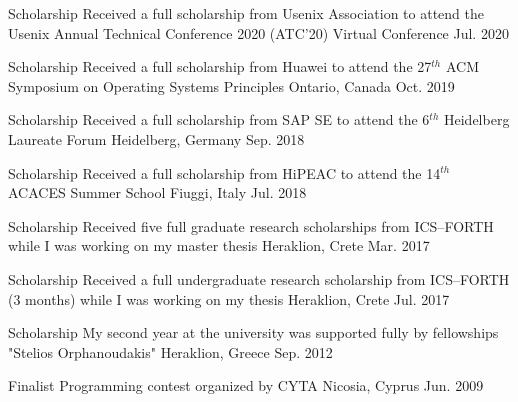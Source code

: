 

\begin{cvhonors}

  \cvhonor
    {Scholarship} %
    {Received a full scholarship from Usenix Association to attend the
    Usenix Annual Technical Conference 2020 (ATC'20)} %
    {Virtual Conference} %
    {Jul. 2020} %

  \cvhonor
    {Scholarship} %
    {Received a full scholarship from Huawei to attend the 27$^{th}$
    ACM Symposium on Operating Systems Principles} %
    {Ontario, Canada} %
    {Oct. 2019} %

  \cvhonor
    {Scholarship} %
    {Received a full scholarship from SAP SE to attend the 6$^{th}$
    Heidelberg Laureate Forum} %
    {Heidelberg, Germany} %
    {Sep. 2018} %

  \cvhonor
    {Scholarship} %
    {Received a full scholarship from HiPEAC to attend the 14$^{th}$
    ACACES Summer School} %
    {Fiuggi, Italy} %
    {Jul. 2018} %

  \cvhonor
    {Scholarship} %
    {Received five full graduate research scholarships from ICS--FORTH
     while I was working on my master thesis} %
    {Heraklion, Crete} %
    {Mar. 2017} %

  \cvhonor
    {Scholarship} %
    {Received a full undergraduate research scholarship from
    ICS--FORTH (3 months) while I was working on my thesis} %
    {Heraklion, Crete} %
    {Jul. 2017} %
  
  \cvhonor
    {Scholarship} %
    {My second year at the university was supported fully by
          fellowships "Stelios Orphanoudakis"} %
    {Heraklion, Greece} %
    {Sep. 2012} %

  \cvhonor
    {Finalist} %
    {Programming contest organized by CYTA} %
    {Nicosia, Cyprus} %
    {Jun. 2009} %

\end{cvhonors}
